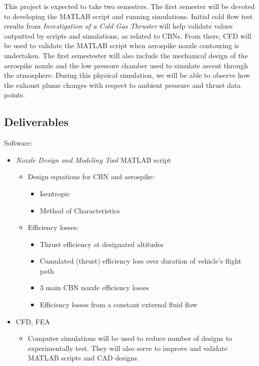 \documentclass[conference]{IEEEtran} %
\begin{document}
	This project is expected to take two semesters. The first semester will be devoted to developing the MATLAB script and running simulations. Initial cold flow test results from \textit{Investigation of a Cold Gas Thruster}\cite{coldgaspdd} will help validate values outputted by scripts and simulations, as related to CBNs. From there, CFD will be used to validate the MATLAB script when aerospike nozzle contouring is undertaken. The first semestester will also include the mechanical design of the aerospike nozzle and the low pressure chamber used to simulate ascent through the atmosphere. During this physical simulation, we will be able to observe how the exhaust plume changes with respect to ambient pressure and thrust data points.
	
	\subsection{Deliverables}
	\label{subsec:deliverables}
	Software:
	\begin{itemize}
		\item \textit{Nozzle Design and Modeling Tool} MATLAB script
		\begin{itemize}
			\item  Design equations for CBN and aerospike:
			\begin{itemize}
				\item Isentropic
				\item Method of Characteristics
			\end{itemize}
			\item  Efficiency losses:
			\begin{itemize}
				\item Thrust efficiency at designated altitudes
				\item Cumulated (thrust) efficiency loss over duration of vehicle's flight path
				\item 3 main CBN nozzle efficiency losses
				\item Efficiency losses from a constant external fluid flow
			\end{itemize}
		\end{itemize}
		\item CFD, FEA
		\begin{itemize}
			\item Computer simulations will be used to reduce number of designs to experimentally test. They will also serve to improve and validate MATLAB scripts and CAD designs.
		\end{itemize}
	\end{itemize}
\end{document}
